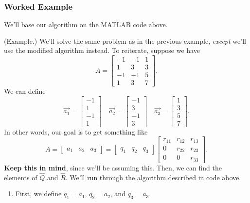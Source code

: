 \documentclass[letterpaper]{article}
\newcommand{\0}{\mathbf{0}}
\begin{document}
\subsubsection{Worked Example}
We'll base our algorithm on the MATLAB code above. 
\begin{mdframed}
    (Example.) We'll solve the same problem as in the previous example, \emph{except} we'll use the modified algorithm instead. To reiterate, suppose we have \[A = \begin{bmatrix}
        -1 & -1 & 1 \\ 
        1 & 3 & 3 \\ 
        -1 & -1 & 5 \\ 
        1 & 3 & 7
    \end{bmatrix}.\]
    We can define 
    \[\vec{a_1} = \begin{bmatrix}
        -1 \\ 1 \\ -1 \\ 1
    \end{bmatrix} \quad \vec{a_2} = \begin{bmatrix}
        -1 \\ 3 \\ -1 \\ 3
    \end{bmatrix} \quad \vec{a_3} = \begin{bmatrix}
        1 \\ 3 \\ 5 \\ 7
    \end{bmatrix}.\]
    In other words, our goal is to get something like 
    \[A = \begin{bmatrix}
        a_1 & a_2 & a_3
    \end{bmatrix} = \begin{bmatrix}
        q_1 & q_2 & q_3
    \end{bmatrix} \begin{bmatrix}
        r_{11} & r_{12} & r_{13} \\ 
        0 & r_{22} & r_{23} \\ 
        0 & 0 & r_{33}
    \end{bmatrix}.\]
    \textbf{Keep this in mind}, since we'll be assuming this. Then, we can find the elements of $\hat{Q}$ and $\hat{R}$. We'll run through the algorithm described in code above. 
    \begin{enumerate}
        \item First, we define $q_1 = a_1$, $q_2 = a_2$, and $q_3 = a_3$. 
        

\end{enumerate}
\end{mdframed}
\end{document}

